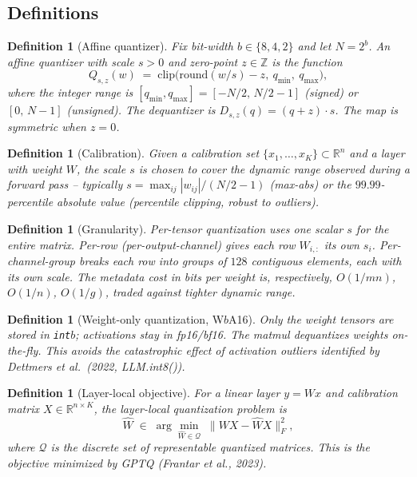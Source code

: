 \documentclass[11pt]{article}
\newtheorem{definition}[theorem]{Definition}
\theoremstyle{remark}
\begin{document}
\subsection*{Definitions}

\begin{definition}[Affine quantizer]
Fix bit-width $b\in\{8,4,2\}$ and let $N=2^b$. An \emph{affine} quantizer with scale $s>0$ and zero-point $z\in\mathbb{Z}$ is the function
\[
Q_{s,z}(w) \;=\; \mathrm{clip}\!\big(\mathrm{round}(w/s) - z,\ q_{\min},\ q_{\max}\big),
\]
where the integer range is $[q_{\min},q_{\max}]=[-N/2,\,N/2-1]$ (signed) or $[0,\,N-1]$ (unsigned). The dequantizer is $D_{s,z}(q)=(q+z)\cdot s$. The map is \emph{symmetric} when $z=0$.
\end{definition}

\begin{definition}[Calibration]
Given a calibration set $\{x_1,\dots,x_K\}\subset\mathbb{R}^n$ and a layer with weight $W$, the scale $s$ is chosen to cover the dynamic range observed during a forward pass -- typically $s=\max_{ij}|w_{ij}|/(N/2-1)$ (max-abs) or the $99.99$-percentile absolute value (percentile clipping, robust to outliers).
\end{definition}

\begin{definition}[Granularity]
\emph{Per-tensor} quantization uses one scalar $s$ for the entire matrix. \emph{Per-row} (per-output-channel) gives each row $W_{i,:}$ its own $s_i$. \emph{Per-channel-group} breaks each row into groups of $128$ contiguous elements, each with its own scale. The metadata cost in bits per weight is, respectively, $O(1/mn)$, $O(1/n)$, $O(1/g)$, traded against tighter dynamic range.
\end{definition}

\begin{definition}[Weight-only quantization, W$b$A16]
Only the weight tensors are stored in \texttt{int}$b$; activations stay in fp16/bf16. The matmul dequantizes weights on-the-fly. This avoids the catastrophic effect of \emph{activation outliers} identified by Dettmers et al.\ (2022, LLM.int8()).
\end{definition}

\begin{definition}[Layer-local objective]
For a linear layer $y=Wx$ and calibration matrix $X\in\mathbb{R}^{n\times K}$, the \emph{layer-local quantization problem} is
\[
\widehat W \;\in\; \arg\min_{\widehat W \in \mathcal{Q}}\; \big\|WX - \widehat W X\big\|_F^2,
\]
where $\mathcal{Q}$ is the discrete set of representable quantized matrices. This is the objective minimized by GPTQ (Frantar et al., 2023).
\end{definition}
\end{document}

